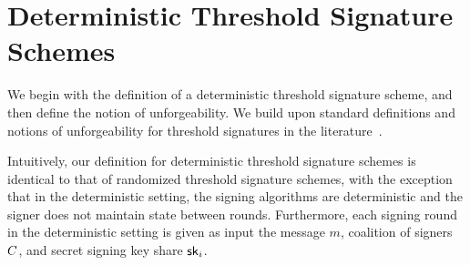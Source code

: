 \section{Deterministic Threshold Signature Schemes}

We begin with the definition of a deterministic threshold signature scheme,
and then define the notion of unforgeability.
We build upon standard definitions and notions of unforgeability for threshold signatures in the literature~\cite{CritesKM23,GennaroJKR01,GennaroRJK07,GennaroG19}.

Intuitively, our definition for deterministic threshold signature schemes is
identical to that of randomized threshold signature schemes,
with the exception that in the deterministic setting,
the signing algorithms are deterministic and the signer does not maintain state between rounds.
Furthermore,
each signing round in the deterministic setting is given as input the message $m$,
coalition of signers $C$,
and secret signing key share $\mathsf{sk}_i$.

